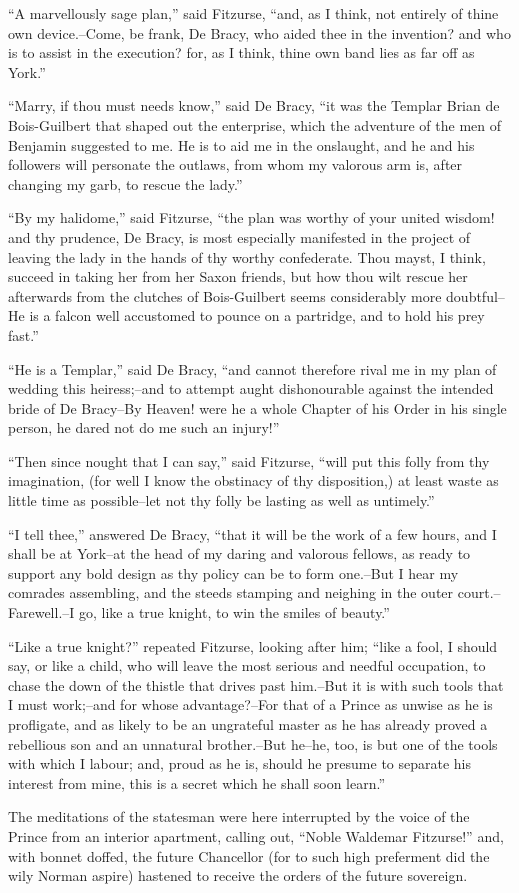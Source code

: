 ``A marvellously sage plan,'' said Fitzurse, ``and, as I think, not
entirely of thine own device.--Come, be frank, De Bracy, who aided thee
in the invention? and who is to assist in the execution? for, as I
think, thine own band lies as far off as York.''

``Marry, if thou must needs know,'' said De Bracy, ``it was the Templar
Brian de Bois-Guilbert that shaped out the enterprise, which the
adventure of the men of Benjamin suggested to me. He is to aid me in the
onslaught, and he and his followers will personate the outlaws, from
whom my valorous arm is, after changing my garb, to rescue the lady.''

``By my halidome,'' said Fitzurse, ``the plan was worthy of your united
wisdom! and thy prudence, De Bracy, is most especially manifested in the
project of leaving the lady in the hands of thy worthy confederate. Thou
mayst, I think, succeed in taking her from her Saxon friends, but how
thou wilt rescue her afterwards from the clutches of Bois-Guilbert seems
considerably more doubtful--He is a falcon well accustomed to pounce on
a partridge, and to hold his prey fast.''

``He is a Templar,'' said De Bracy, ``and cannot therefore rival me in
my plan of wedding this heiress;--and to attempt aught dishonourable
against the intended bride of De Bracy--By Heaven! were he a whole
Chapter of his Order in his single person, he dared not do me such an
injury!''

``Then since nought that I can say,'' said Fitzurse, ``will put this
folly from thy imagination, (for well I know the obstinacy of thy
disposition,) at least waste as little time as possible--let not thy
folly be lasting as well as untimely.''

``I tell thee,'' answered De Bracy, ``that it will be the work of a few
hours, and I shall be at York--at the head of my daring and valorous
fellows, as ready to support any bold design as thy policy can be to
form one.--But I hear my comrades assembling, and the steeds stamping
and neighing in the outer court.--Farewell.--I go, like a true knight,
to win the smiles of beauty.''

``Like a true knight?'' repeated Fitzurse, looking after him; ``like a
fool, I should say, or like a child, who will leave the most serious and
needful occupation, to chase the down of the thistle that drives past
him.--But it is with such tools that I must work;--and for whose
advantage?--For that of a Prince as unwise as he is profligate, and as
likely to be an ungrateful master as he has already proved a rebellious
son and an unnatural brother.--But he--he, too, is but one of the tools
with which I labour; and, proud as he is, should he presume to separate
his interest from mine, this is a secret which he shall soon learn.''

The meditations of the statesman were here interrupted by the voice of
the Prince from an interior apartment, calling out, ``Noble Waldemar
Fitzurse!'' and, with bonnet doffed, the future Chancellor (for to such
high preferment did the wily Norman aspire) hastened to receive the
orders of the future sovereign.

